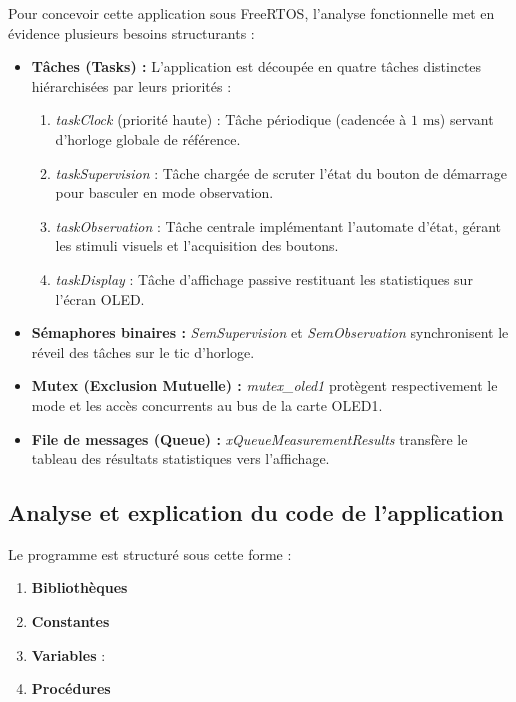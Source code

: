 Pour concevoir cette application sous FreeRTOS, l'analyse fonctionnelle met en évidence plusieurs besoins structurants :
\begin{itemize}
    \item \textbf{Tâches (Tasks) :} L'application est découpée en quatre tâches distinctes hiérarchisées par leurs priorités :
    \begin{enumerate}
        \item \textit{taskClock} (priorité haute) : Tâche périodique (cadencée à $1\text{ ms}$) servant d'horloge globale de référence.
        \item \textit{taskSupervision} : Tâche chargée de scruter l'état du bouton de démarrage pour basculer en mode observation.
        \item \textit{taskObservation} : Tâche centrale implémentant l'automate d'état, gérant les stimuli visuels et l'acquisition des boutons.
        \item \textit{taskDisplay} : Tâche d'affichage passive restituant les statistiques sur l'écran OLED.
    \end{enumerate}
    \item \textbf{Sémaphores binaires :} \textit{SemSupervision} et \textit{SemObservation} synchronisent le réveil des tâches sur le tic d'horloge.
    \item \textbf{Mutex (Exclusion Mutuelle) :} \textit{mutex\_oled1} protègent respectivement le mode et les accès concurrents au bus de la carte OLED1.
    \item \textbf{File de messages (Queue) :} \textit{xQueueMeasurementResults} transfère le tableau des résultats statistiques vers l'affichage.
\end{itemize}

\subsection{Analyse et explication du code de l'application}

Le programme est structuré sous cette forme : 

\begin{enumerate}
    \item \textbf{Bibliothèques}
    \item \textbf{Constantes}
    \item \textbf{Variables} :
    \item \textbf{Procédures}
\end{enumerate}

